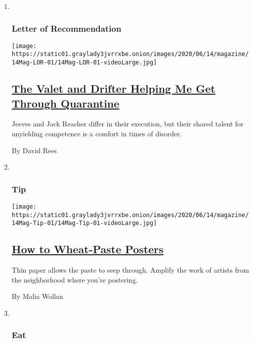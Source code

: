 \begin{enumerate}
\def\labelenumi{\arabic{enumi}.}
\item ~
  \hypertarget{letter-of-recommendation}{%
  \subsubsection{Letter of
  Recommendation}\label{letter-of-recommendation}}

  \texttt{[image: https://static01.graylady3jvrrxbe.onion/images/2020/06/14/magazine/14Mag-LOR-01/14Mag-LOR-01-videoLarge.jpg]}

  \hypertarget{the-valet-and-drifter-helping-me-get-through-quarantine}{%
  \subsection{\texorpdfstring{\href{/2020/06/09/magazine/the-valet-and-drifter-helping-me-get-through-quarantine.html}{The
  Valet and Drifter Helping Me Get Through
  Quarantine}}{The Valet and Drifter Helping Me Get Through Quarantine}}\label{the-valet-and-drifter-helping-me-get-through-quarantine}}

  Jeeves and Jack Reacher differ in their execution, but their shared
  talent for unyielding competence is a comfort in times of disorder.

  By David Rees
\item ~
  \hypertarget{tip}{%
  \subsubsection{Tip}\label{tip}}

  \texttt{[image: https://static01.graylady3jvrrxbe.onion/images/2020/06/14/magazine/14Mag-Tip-01/14Mag-Tip-01-videoLarge.jpg]}

  \hypertarget{how-to-wheat-paste-posters}{%
  \subsection{\texorpdfstring{\href{/2020/06/09/magazine/how-to-wheat-paste-posters.html}{How
  to Wheat-Paste
  Posters}}{How to Wheat-Paste Posters}}\label{how-to-wheat-paste-posters}}

  Thin paper allows the paste to seep through. Amplify the work of
  artists from the neighborhood where you're postering.

  By Malia Wollan
\item ~
  \hypertarget{eat}{%
  \subsubsection{Eat}\label{eat}}


\end{enumerate}
